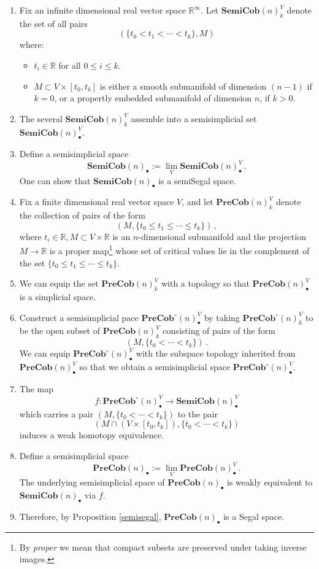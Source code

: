 \documentclass[a4paper,11pt]{article}
\theoremstyle{plain}
\theoremstyle{definition}
\theoremstyle{remark}
\begin{document}
\begin{enumerate}[label = \arabic*)]
    \item Fix an infinite dimensional real vector space $\mathbb{R}^{\infty}$. Let $\textbf{SemiCob}(n)_k^V$ denote the set of all pairs 
    $$(\{t_0 < t_1 < \cdots < t_k\} , M)$$
    where: 
    \begin{itemize}
    \item $t_i \in \mathbb{R}$ for all $0 \leq i \leq k$.
    \item $M \subset V \times [t_0, t_k]$ is either a smooth submanifold of dimension $(n-1)$ if $k  = 0$, or a propertly embedded submanifold of dimension $n$, if $k >0$. 
    \end{itemize}
    \item The several $\textbf{SemiCob}(n)_k^V$ assemble into a semisimplicial set $\textbf{SemiCob}(n)_{\bullet}^V$.
    \item Define a semisimplicial space
    $$\textbf{SemiCob}(n)_{\bullet} := \lim_{V} \textbf{SemiCob}(n)_{\bullet}^V  \, .$$
    One can show that $\textbf{SemiCob}(n)_{\bullet}$ is a semiSegal space. 
    \item Fix a finite dimensional real vector space $V$, and let $\textbf{PreCob}(n)_k^V$ denote the collection of pairs of the form 
    $$(M, \{t_0 \leq t_1 \leq \cdots \leq t_k\})\, ,$$
    where $t_i \in \mathbb{R}, M \subset V \times \mathbb{R}$ is an $n$-dimensional submanifold and the projection $M \to \mathbb{R}$ is a proper map\footnote{By \textit{proper} we mean that compact subsets are preserved under taking inverse images.} whose set of critical values lie in the complement of the set $\{t_0 \leq t_1 \leq \cdots \leq t_k\}$. 
    \item We can equip the set $\textbf{PreCob}(n)_k^V$ with a topology so that $\textbf{PreCob}(n)_{\bullet}^V$ is a simplicial space.  
    \item Construct a semisimplicial pace $\textbf{PreCob}^{\circ}(n)_{\bullet}^V$ by taking $\textbf{PreCob}^{\circ}(n)_k^V$ to be the open subset of $\textbf{PreCob}(n)_k^V$ consisting of pairs of the form 
    $$(M, \{t_0 < \cdots < t_k\}) \, .$$
    We can equip $\textbf{PreCob}^{\circ}(n)_{\bullet}^V$ with the subspace topology inherited from $\textbf{PreCob}(n)_{\bullet}^V$ so that we obtain a semisimplicial space $\textbf{PreCob}^{\circ}(n)_{\bullet}^V$. 
    \item The map 
    $$f \colon \textbf{PreCob}^{\circ}(n)_{\bullet}^V \to \textbf{SemiCob}(n)_{\bullet}^V$$
    which carries a pair $(M, \{t_0 < \cdots < t_k\})$ to the pair 
    $$(M \cap (V \times [t_0, t_k]), \{t_0 < \cdots < t_k \})$$
    induces a weak homotopy equivalence.
    \item Define a semisimplicial space
    $$\textbf{PreCob}(n)_{\bullet} := \lim_V \textbf{PreCob}(n)_{\bullet}^V \, .$$
    The underlying semisimplicial space of $\textbf{PreCob}(n)_{\bullet}$ is weakly equivalent to $\textbf{SemiCob}(n)_{\bullet}$ via $f$.
    \item Therefore, by Proposition \ref{semisegal}, $\textbf{PreCob}(n)_{\bullet}$ is a Segal space. 
\end{enumerate}
\end{document}
